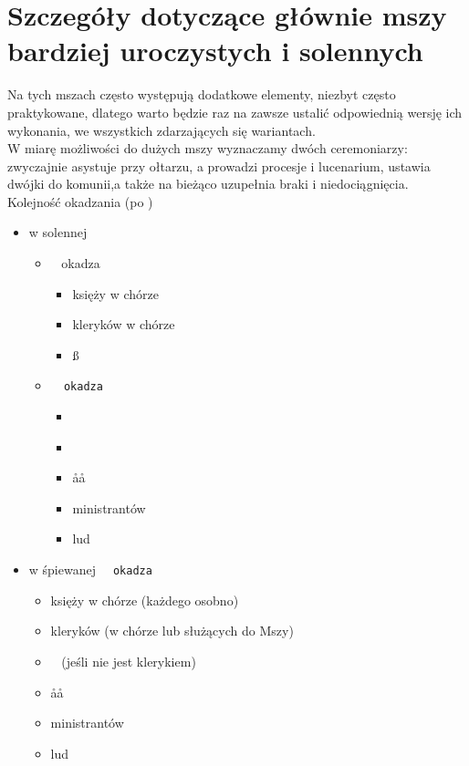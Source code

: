 \section{Szczegóły dotyczące głównie mszy bardziej uroczystych i solennych}

Na tych mszach często występują dodatkowe elementy, niezbyt często praktykowane,
dlatego warto będzie raz na zawsze ustalić odpowiednią wersję ich wykonania, we
wszystkich zdarzających się wariantach.\\

\noindent W miarę możliwości do dużych mszy wyznaczamy dwóch ceremoniarzy: 
zwyczajnie asystuje \ii przy ołtarzu, a  prowadzi procesje i lucenarium,
ustawia dwójki do komunii,a także na bieżąco uzupełnia braki i
niedociągnięcia.\\

Kolejność okadzania (po \ii)
\begin{itemize}
	\item w solennej
	      \begin{itemize}
		      \item \dd~ okadza
		            \begin{itemize}
			            \item księży w chórze
			            \item kleryków w chórze
			            \item \ss~
		            \end{itemize}
		      \item \tt~ okadza
		            \begin{itemize}
			            \item \dd~
			            \item \cc~
			            \item \aa\aa~
			            \item ministrantów
			            \item lud
		            \end{itemize}
	      \end{itemize}
	\item w śpiewanej \tt~ okadza
	      \begin{itemize}
		      \item księży w chórze (każdego osobno)
		      \item kleryków (w chórze lub służących do Mszy)
		      \item \cc~ (jeśli nie jest klerykiem)
		      \item \aa\aa~
		      \item ministrantów
		      \item lud
	      \end{itemize}
\end{itemize}

